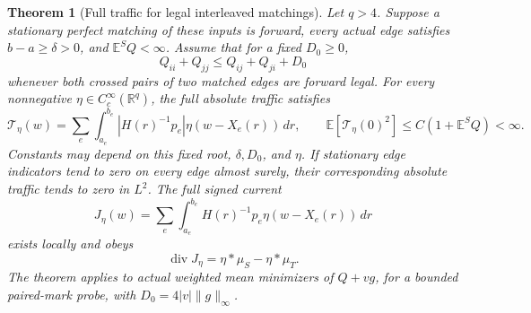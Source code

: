 \documentclass[11pt,reqno]{amsart}
\newtheorem{theorem}{Theorem}[section]
\theoremstyle{definition}
\theoremstyle{remark}
\numberwithin{equation}{section}
\newcommand{\R}{\mathbb R}
\newcommand{\E}{\mathbb E}
\begin{document}
\begin{theorem}[Full traffic for legal interleaved matchings]
\label{thm:interleaved-focal-traffic}
Let \(q>4\). Suppose a stationary perfect matching of these inputs is
forward, every actual edge satisfies \(b-a\ge\delta>0\), and
\(\E^S Q<\infty\). Assume that for a fixed \(D_0\ge0\),
\[
 Q_{ii}+Q_{jj}\le Q_{ij}+Q_{ji}+D_0
\]
whenever both crossed pairs of two matched edges are forward legal.
For every nonnegative \(\eta\in C_c^\infty(\R^q)\), the full absolute
traffic satisfies
\begin{equation}
\label{eq:interleaved-focal-traffic}
 \mathcal T_\eta(w)=\sum_e\int_{a_e}^{b_e}
 |H(r)^{-1}p_e|\eta(w-X_e(r))\,dr,
 \qquad
 \E[\mathcal T_\eta(0)^2]\le C(1+\E^S Q)<\infty.
\end{equation}
Constants may depend on this fixed root, \(\delta,D_0\), and \(\eta\).
If stationary edge indicators tend to zero on every edge almost surely,
their corresponding absolute traffic tends to zero in \(L^2\).
The full signed current
\[
 J_\eta(w)=\sum_e\int_{a_e}^{b_e}
 H(r)^{-1}p_e\eta(w-X_e(r))\,dr
\]
exists locally and obeys
\begin{equation}
\label{eq:interleaved-current-divergence}
 \operatorname{div}J_\eta=\eta*\mu_S-\eta*\mu_T.
\end{equation}
The theorem applies to actual weighted mean minimizers of \(Q+v g\),
for a bounded paired-mark probe, with \(D_0=4|v|\|g\|_\infty\).
\end{theorem}
\end{document}
